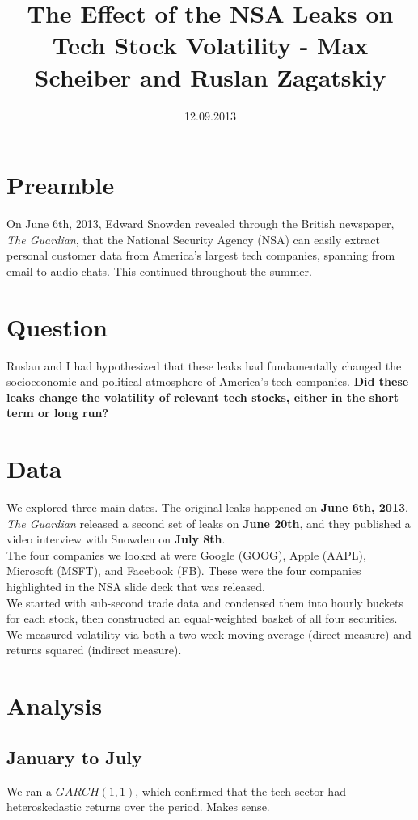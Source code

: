 \documentclass[11pt]{amsart}
\title{The Effect of the NSA Leaks on Tech Stock Volatility - Max Scheiber and Ruslan Zagatskiy}
\date{12.09.2013}
\begin{document}
\maketitle
\section{Preamble}
On June 6th, 2013, Edward Snowden revealed through the British newspaper, \textit{The Guardian}, that the National Security Agency (NSA) can easily extract personal customer data from America's largest tech companies, spanning from email to audio chats. This continued throughout the summer.

\section{Question}
Ruslan and I had hypothesized that these leaks had fundamentally changed the socioeconomic and political atmosphere of America's tech companies. \textbf{Did these leaks change the volatility of relevant tech stocks, either in the short term or long run?}

\section{Data}
We explored three main dates. The original leaks happened on \textbf{June 6th, 2013}. \textit{The Guardian} released a second set of leaks on \textbf{June 20th}, and they published a video interview with Snowden on \textbf{July 8th}. \\

The four companies we looked at were Google (GOOG), Apple (AAPL), Microsoft (MSFT), and Facebook (FB). These were the four companies highlighted in the NSA slide deck that was released. \\

We started with sub-second trade data and condensed them into hourly buckets for each stock, then constructed an equal-weighted basket of all four securities. We measured volatility via both a two-week moving average (direct measure) and returns squared (indirect measure).

\section{Analysis}
\subsection{January to July}
We ran a $GARCH(1,1)$, which confirmed that the tech sector had heteroskedastic returns over the period. Makes sense.
\end{document}
